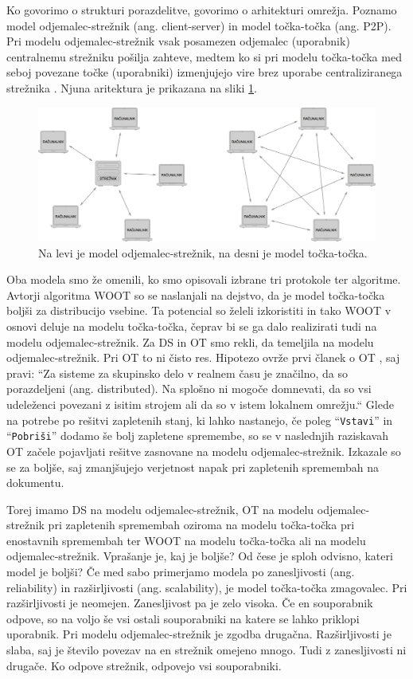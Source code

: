 \documentclass[a4paper, 12pt, twoside]{book}
\begin{document}
Ko govorimo o strukturi porazdelitve, govorimo o arhitekturi omrežja. Poznamo model odjemalec-strežnik (ang. client-server) in model točka-točka (ang. P2P). Pri modelu odjemalec-strežnik vsak posamezen odjemalec (uporabnik) centralnemu strežniku pošilja zahteve, medtem ko si pri modelu točka-točka med seboj povezane točke (uporabniki) izmenjujejo vire brez uporabe centraliziranega strežnika \cite{p2p} \cite{c-s}. Njuna aritektura je prikazana na sliki \ref{p2p_c-s}.

\begin{figure}[placement h]
\begin{center}
\includegraphics[width=13cm]{p2p_c-s.png}
\end{center}
\caption{Na levi je model odjemalec-strežnik, na desni je model točka-točka.}
\label{p2p_c-s}
\end{figure}

Oba modela smo že omenili, ko smo opisovali izbrane tri protokole ter algoritme. Avtorji algoritma WOOT so se naslanjali na dejstvo, da je model točka-točka boljši za distribucijo vsebine. Ta potencial so želeli izkoristiti in tako WOOT v osnovi deluje na modelu točka-točka, čeprav bi se ga dalo realizirati tudi na modelu odjemalec-strežnik. Za DS in OT smo rekli, da temeljila na modelu odjemalec-strežnik. Pri OT to ni čisto res. Hipotezo ovrže prvi članek o OT \cite{ccigs}, saj pravi: “Za sisteme za skupinsko delo v realnem času je značilno, da so porazdeljeni (ang. distributed). Na splošno ni mogoče domnevati, da so vsi udeleženci povezani z isitim strojem ali da so v istem lokalnem omrežju.“ Glede na potrebe po rešitvi zapletenih stanj, ki lahko nastanejo, če poleg “{\tt Vstavi}” in “{\tt Pobriši}” dodamo še bolj zapletene spremembe, so se v naslednjih raziskavah OT \cite{hllbw} začele pojavljati rešitve zasnovane na modelu odjemalec-strežnik. Izkazale so se za boljše, saj zmanjšujejo verjetnost napak pri zapletenih spremembah na dokumentu.

Torej imamo DS na modelu odjemalec-strežnik, OT na modelu odjemalec-strežnik pri zapletenih spremembah oziroma na modelu točka-točka pri enostavnih spremembah ter WOOT na modelu točka-točka ali na modelu odjemalec-strežnik. Vprašanje je, kaj je boljše? Od čese je sploh odvisno, kateri model je boljši? Če med sabo primerjamo modela po zanesljivosti (ang. reliability) in razširljivosti (ang. scalability), je model točka-točka zmagovalec. Pri razširljivosti je neomejen. Zanesljivost pa je zelo visoka. Če en souporabnik odpove, so na voljo še vsi ostali souporabniki na katere se lahko priklopi uporabnik. Pri modelu odjemalec-strežnik je zgodba drugačna. Razširljivosti je slaba, saj je število povezav na en strežnik omejeno mnogo. Tudi z zanesljivosti ni drugače. Ko odpove strežnik, odpovejo vsi souporabniki.
\end{document}
